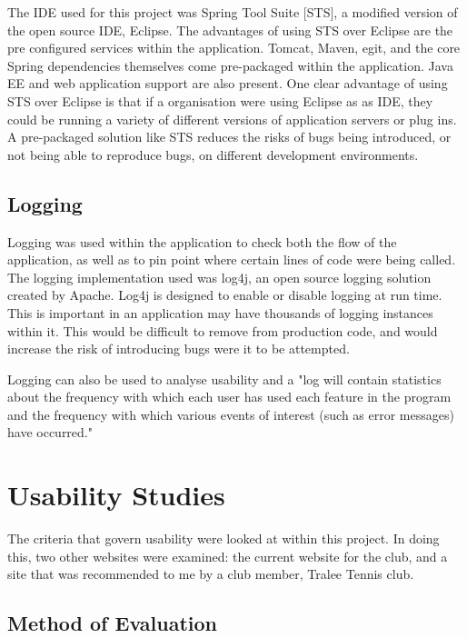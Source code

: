 The IDE used for this project was Spring Tool Suite [STS], a modified version of the open source IDE, Eclipse. The advantages of using STS over Eclipse are the pre configured services within the application. Tomcat, Maven, egit, and the core Spring dependencies themselves come pre-packaged within the application. Java EE and web application support are also present. One clear advantage of using STS over Eclipse is that if a organisation were using Eclipse as as IDE, they could be running a variety of different versions of application servers or plug ins. A pre-packaged solution like STS reduces the risks of bugs being introduced, or not being able to reproduce bugs, on different development environments.

\subsection{Logging}

Logging was used within the application to check both the flow of the application, as well as to pin point where certain lines of code were being called. The logging implementation used was log4j, an open source logging solution created by Apache. Log4j is designed to enable or disable logging at run time. This is important in an application may have thousands of logging instances within it. This would be difficult to remove from production code, and would increase the risk of introducing bugs were it to be attempted. 

Logging can also be used to analyse usability and a "log will contain statistics about the frequency with which each user has used each feature in the program and the frequency with which various events of interest (such as error messages) have occurred." \parencite{holzinger2005usability}

\section{Usability Studies}

The criteria that govern usability were looked at within this project. In doing this, two other websites were examined: the current website for the club, and a site that was recommended to me by a club member, Tralee Tennis club. 

\subsection{Method of Evaluation}

